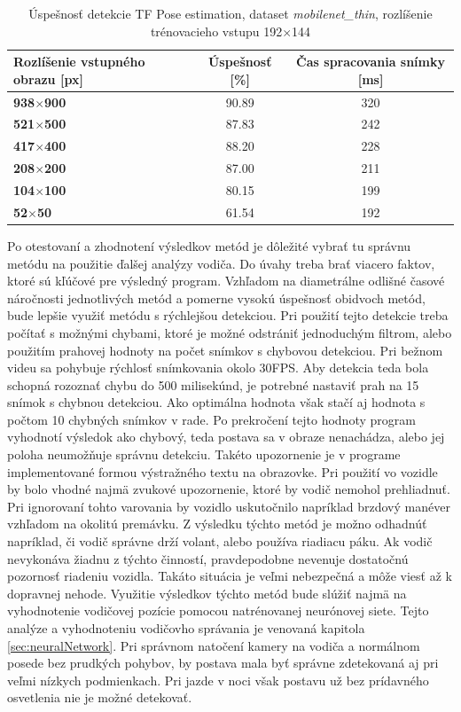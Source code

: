 \documentclass[slovak,master,dept460,male,cpp,cpdeclaration]{diploma}
\begin{document}
\begin{table}[H]
\begin{tabular}{|l|c|c|}
\hline
\textbf{Rozlíšenie vstupného obrazu [px]}        & \textbf{Úspešnosť [\%]}  & \textbf{Čas spracovania snímky [ms]} \\ \hline
\textbf{938$\times$900}      & 90.89     &  320       \\ \hline
\textbf{521$\times$500}      & 87.83     &  242    \\ \hline
\textbf{417$\times$400}      & 88.20     &  228    \\ \hline
\textbf{208$\times$200}      & 87.00     &  211   \\ \hline
\textbf{104$\times$100}      & 80.15     &  199       \\ \hline
\textbf{52$\times$50}       & 61.54    &  192       \\ \hline
\end{tabular}

	\caption{Úspešnosť detekcie TF Pose estimation, dataset \textit{mobilenet\_thin}, rozlíšenie trénovacieho vstupu 192$\times$144}
	\label{tab:tf3}
\end{table}

Po otestovaní a zhodnotení  výsledkov metód  je dôležité vybrať tu správnu metódu na  použitie ďalšej analýzy vodiča. Do úvahy treba brať viacero faktov, ktoré sú kľúčové pre výsledný program. Vzhľadom na diametrálne odlišné časové náročnosti jednotlivých metód a pomerne vysokú úspešnosť obidvoch metód, bude lepšie využiť metódu s rýchlejšou detekciou. Pri použití tejto detekcie treba počítať s možnými chybami, ktoré je možné odstrániť jednoduchým filtrom, alebo použitím  prahovej hodnoty na počet snímkov s chybovou detekciou. Pri bežnom videu sa pohybuje rýchlosť snímkovania okolo 30FPS. Aby detekcia teda  bola schopná rozoznať chybu do 500 milisekúnd, je potrebné nastaviť prah na 15 snímok s chybnou detekciou. Ako optimálna hodnota však stačí aj hodnota s počtom 10 chybných snímkov v rade. Po prekročení tejto hodnoty program vyhodnotí výsledok ako chybový, teda postava sa v obraze nenachádza, alebo jej poloha neumožňuje správnu detekciu. Takéto upozornenie je v programe  implementované formou výstražného textu na obrazovke. Pri použití vo vozidle by bolo vhodné najmä zvukové upozornenie, ktoré by vodič nemohol prehliadnuť.  Pri ignorovaní tohto varovania by vozidlo uskutočnilo napríklad brzdový  manéver  vzhľadom na okolitú premávku. Z výsledku týchto metód je možno odhadnúť napríklad, či vodič správne drží volant, alebo používa riadiacu páku. Ak  vodič nevykonáva žiadnu z týchto činností, pravdepodobne nevenuje dostatočnú pozornosť riadeniu vozidla. Takáto situácia je veľmi nebezpečná a môže viesť až k dopravnej nehode. Využitie výsledkov týchto metód bude slúžiť najmä na  vyhodnotenie vodičovej pozície pomocou natrénovanej neurónovej siete. Tejto analýze a vyhodnoteniu  vodičovho správania je venovaná kapitola \ref{sec:neuralNetwork}. Pri správnom natočení kamery na vodiča a normálnom posede bez prudkých pohybov, by postava mala byť správne zdetekovaná aj pri veľmi nízkych podmienkach. Pri jazde v noci však postavu už bez prídavného  osvetlenia nie je možné detekovať.
\end{document}
